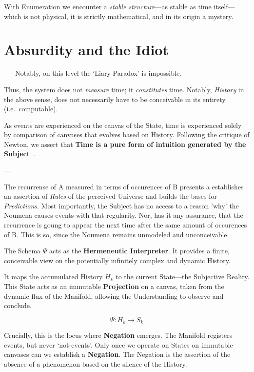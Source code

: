 \documentclass[11pt, a4paper]{article}
\theoremstyle{formalism}
\begin{document}
{With Enumeration we encounter a {\it stable structure}---as stable as time
itself---which is not physical, it is strictly mathematical, and in its origin
a mystery. 

\section{Absurdity and the Idiot}
----
Notably, on this level the `Liary Paradox' is impossible. 

Thus, the system does not \textit{measure} time; it \textit{constitutes} time.
Notably, {\it History\/} in the above sense, does not necessarily have to be
conceivable in its entirety (i.e.\ computable).

As events are experienced on the canvas of the State, time is experienced
solely by comparison of canvases that evolves based on History. Following the
critique of Newton, we assert that \textbf{Time is a pure form of intuition
generated by the Subject}~\cite{Kant1781}.

---

The recurrense of A measured in terms of occurences of B presents a establishes
an assertion of {\it Rules\/} of the perceived Universe and builds the bases
for {\it Predictions}. Most importantly, the Subject has no access to a reason
'why' the Noumena causes events with that regularity. Nor, has it any
assurance, that the recurrence is goung to appear the next time after the same
amount of occurences of B. This is so, since the Noumena remains unmodeled and 
unconceivable.



The Schema $\Psi$ acts as the \textbf{Hermeneutic Interpreter}. It provides a
finite, conceivable view on the potentially infinitely complex and dynamic History. 

It maps the accumulated History $H_k$ to the current State---the Subjective
Reality. This State acts as an immutable \textbf{Projection} on a canvas, taken
from the dynamic flux of the Manifold, allowing the Understanding to observe
and conclude.

\begin{equation}
\Psi: H_k \to S_k
\end{equation}

Crucially, this is the locus where \textbf{Negation} emerges. The Manifold
registers events, but never `not-events'. Only once we operate on States on
immutable canvases can we establish a \textbf{Negation}. The Negation is the
assertion of the absence of a phenomenon based on the silence of the History.

}
\end{document}
